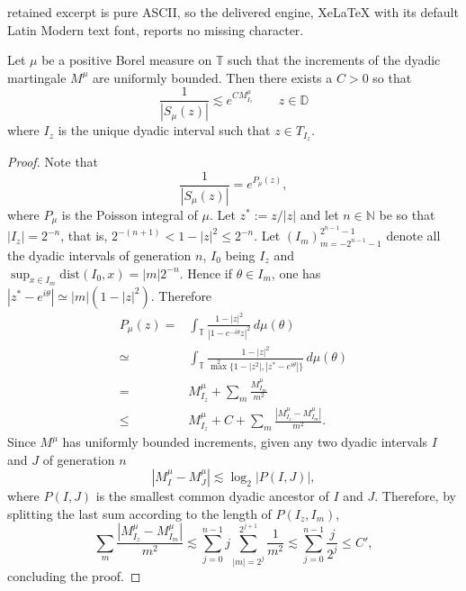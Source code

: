 \documentclass[10pt,a4paper]{amsart}
\newcommand{\D}{\mathbb{D}}
\newcommand{\N}{\mathbb{N}}
\newcommand{\T}{\mathbb{T}}
\newcommand{\dist}{\mathrm{dist}}
\begin{document}
retained excerpt is pure ASCII, so the delivered engine, XeLaTeX with its default Latin Modern text font, reports no missing character.
\begin{lemma}
\label{lemma:Poisson}
Let $\mu$ be a positive Borel measure on $\T$ such that the increments of the dyadic martingale $M^\mu$ are uniformly bounded. Then there exists a $C>0$ so that
\[
\frac{1}{|S_\mu(z)|}\lesssim e^{CM^\mu_{I_z}}\qquad z\in\D
\]
where $I_z$ is the unique dyadic interval such that $z\in T_{I_z}$.
\end{lemma}

\begin{proof}
Note that 
\[
\frac{1}{|S_\mu(z)|}=e^{P_\mu(z)},
\]
where $P_\mu$ is the Poisson integral of $\mu$. Let $z^*:=z/|z|$ and let $n\in\N$ be so that $|I_z|=2^{-n}$, that is, $2^{-(n+1)}<1-|z|^2\leq 2^{-n}$. Let $(I_m)_{m=-2^{n-1}-1}^{2^{n-1}-1}$ denote all the dyadic intervals of generation $n$, $I_0$ being $I_z$ and $\sup_{x \in I_m}
 \dist(I_0, x)=|m|2^{-n}$. Hence if $\theta\in I_m$, one has $|z^*-e^{i\theta}|\simeq |m|(1-|z|^2)$. Therefore
\[
\begin{split}
P_\mu(z)=&\int_\T\frac{1-|z|^2}{|1-e^{-i\theta}z|^2}\,d\mu(\theta)\\
\simeq&\int_\T\frac{1-|z|^2}{\max^2\{1-|z^2|, |z^*-e^{i\theta}|\}}\,d\mu(\theta)\\
=& M^\mu_{I_z}+\sum_{m}\frac{M^\mu_{I_m}}{m^2}\\
\leq& M^\mu_{I_z}+C+\sum_m\frac{|M^\mu_{I_z}-M^\mu_{I_m}|}{m^2}.
\end{split}
\]
Since $M^\mu$ has uniformly bounded increments, given any two dyadic intervals $I$ and $J$ of generation $n$ 
\[
|M^\mu_I-M^\mu_J|\lesssim\log_2|P(I, J)|,
\]
where $P(I, J)$ is the smallest common dyadic ancestor of $I$ and $J$. Therefore, by splitting the last sum according to the length of $P(I_z, I_m)$, 
\[
\sum_m\frac{|M^\mu_{I_z}-M^\mu_{I_m}|}{m^2}\lesssim\sum_{j=0}^{n-1}j\sum_{|m|=2^{j}}^{2^{j+1}}\frac{1}{m^2}\lesssim\sum_{j=0}^{n-1}\frac{j}{2^j}\leq C',
\]
concluding the proof.
\end{proof}
\end{document}
